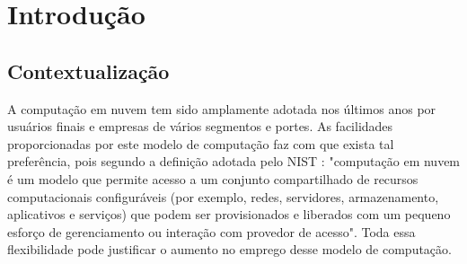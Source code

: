 \chapter{\label{chap:intro}Introdução}




%
%
%
%

\section{Contextualização}

A computação em nuvem tem sido amplamente adotada nos últimos anos por usuários finais e empresas de vários segmentos e portes.
As facilidades proporcionadas por este modelo de computação faz com que exista tal preferência, pois segundo a definição adotada
pelo NIST \cite{Mell:2011}: "computação em nuvem é um modelo que permite acesso a um conjunto compartilhado de recursos computacionais configuráveis (por exemplo, redes, servidores, armazenamento, aplicativos e serviços) que podem ser provisionados e liberados  com um pequeno esforço de gerenciamento ou interação com provedor de acesso".
Toda essa flexibilidade pode justificar o aumento no emprego desse modelo de computação.

